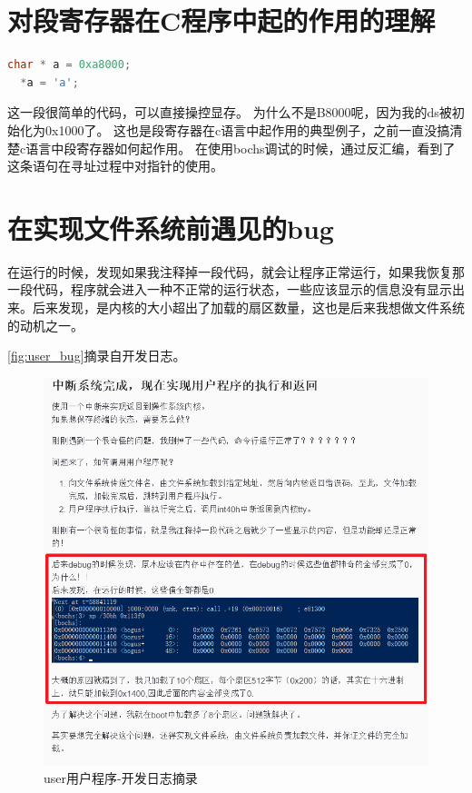 \documentclass[forprint]{WHUBachelor}
\begin{document}
\section{对段寄存器在C程序中起的作用的理解}

\begin{lstlisting}[language=c]
  char * a = 0xa8000;
  *a = 'a';
\end{lstlisting}
  
  这一段很简单的代码，可以直接操控显存。
  为什么不是B8000呢，因为我的ds被初始化为0x1000了。
  这也是段寄存器在c语言中起作用的典型例子，之前一直没搞清楚c语言中段寄存器如何起作用。
  在使用bochs调试的时候，通过反汇编，看到了这条语句在寻址过程中对指针的使用。
  
\section{在实现文件系统前遇见的bug}

在运行的时候，发现如果我注释掉一段代码，就会让程序正常运行，如果我恢复那一段代码，程序就会进入一种不正常的运行状态，一些应该显示的信息没有显示出来。后来发现，是内核的大小超出了加载的扇区数量，这也是后来我想做文件系统的动机之一。

\autoref{fig:user_bug}摘录自开发日志。

\begin{figure}[htp]
  \centering
  \includegraphics[width=17cm]{"./figure/user_bug.png"}
  \caption{user用户程序-开发日志摘录}
  \label{fig:user_bug}
\end{figure}
\end{document}
